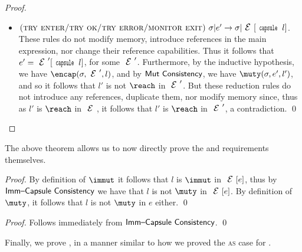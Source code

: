 \begin{proof}
\begin{enumerate}
\begin{itemize}
			\item $\crule{try enter/try ok/try error/monitor exit}{\s}{e'}{\s}{\E[\Kw{capsule}\,l]}$.
				These rules do not modify memory, introduce references in the main
				expression, nor change their reference capabilities. Thus it follows
				that $e' = \E'[\Kw{capsule}\,l]$, for some $\E'$.
				Furthermore, by the inductive hypothesis, we have $\encap(\s,\E',l)$, and by
				$\textsf{Mut Consistency}$, we have $\muty(\s,e',l')$, and
				so it follows that $l'$ is not $\reach$ in $\E'$.
				But these reduction rules do not introduce any references,  duplicate
				them, nor modify memory since, thus as $l'$ is $\reach$
				in $\E$, it follows that $l'$ is $\reach$ in $\E'$, a contradiction.
		\qed\end{itemize}

	\end{enumerate}
\end{proof}

\LS

The above theorem allows us to now directly prove the  and  requirements themselves.

\setcounter{requirement}{1}
\SS\REQImmCons
\SS\begin{proof}
	By definition of $\immut$ it follows that $l$ is $\immut$ in $\E[e]$,
	thus by $\textsf{Imm--Capsule Consistency}$ we have
	that $l$ is not $\muty$ in $\E[e]$. By definition of $\muty$,
	it follows that $l$ is not $\muty$ in $e$ either.
\qed\end{proof}

\LS

\setcounter{requirement}{3}
\SS\REQCapCons
\SS\begin{proof}
	Follows immediately from $\textsf{Imm--Capsule Consistency}$.
\qed\end{proof}

\LS

Finally, we prove , in a manner similar to how we proved the \textsc{as} case for .

